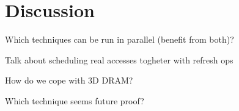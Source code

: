 \section{Discussion} 
\label{sec:disc}

Which techniques can be run in parallel (benefit from both)?

Talk about scheduling real accesses togheter with refresh ops

How do we cope with 3D DRAM?

Which technique seems future proof?
